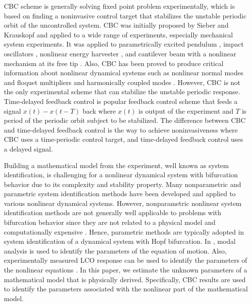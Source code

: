 \documentclass[openacc]{rsproca_new}%
\theoremstyle{own}
\begin{document}
CBC scheme is generally solving fixed point problem experimentally, which is based on finding a noninvasive control target that stabilizes the unstable periodic orbit of the uncontrolled system. CBC was initially proposed by Sieber and Krauskopf \cite{sieber2008control} and applied to a wide range of experiments, especially mechanical system experiments. It was applied to parametrically excited pendulum \cite{sieber2011control}, impact oscillators \cite{bureau2013experimental,bureau2014experimental}, nonlinear energy harvester \cite{barton2013systematic,barton2011numerical}
, and cantilever beam with a nonlinear mechanism at its free tip \cite{renson2019application}. Also, CBC has been proved to produce critical information about nonlinear dynamical systems such as nonlinear normal modes \cite{renson2016robust,renson2016experimental} and floquet multipliers \cite{barton2017control} and harmonically coupled modes \cite{renson2019application}. However, CBC is not the only experimental scheme that can stabilize the unstable periodic response. Time-delayed feedback control \cite{pyragas2006delayed,sieber2016generic} is popular feedback control scheme that feeds a signal $x(t)-x(t-T)$ back where $x(t)$ is output of the experiment and $T$ is period of the periodic orbit subject to be stabilized. The difference between CBC and time-delayed feedback control is the way to achieve noninvasiveness where CBC uses a time-periodic control target, and time-delayed feedback control uses a delayed signal.

Building a mathematical model from the experiment, well known as system identification, is challenging for a nonlinear dynamical system with bifurcation behavior due to its complexity and stability property. Many nonparametric and parametric system identification methods have been developed and applied to various nonlinear dynamical systems. However, nonparametric nonlinear system identification methods are not generally well applicable to problems with bifurcation behavior since they are not related to a physical model and computationally expensive \cite{thothadri2005nonlinear}. Hence, parametric methods are typically adopted in system identification of a dynamical system with Hopf bifurcation. In \cite{fichera2014experimental}, modal analysis is used to identify the parameters of the equation of motion. Also, experimentally measured LCO response can be used to identify the parameters of the nonlinear equations \cite{abdelkefi2013analytical}. In this paper, we estimate the unknown parameters of a mathematical model that is physically derived. Specifically, CBC results are used to identify the parameters associated with the nonlinear part of the mathematical model.
\end{document}
